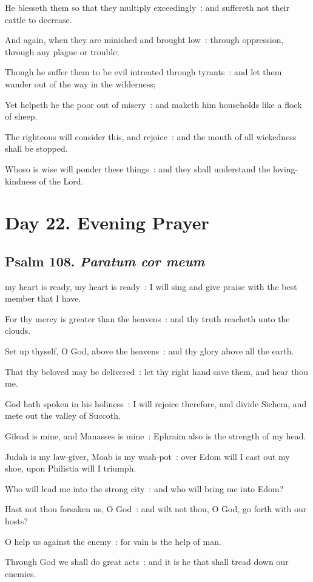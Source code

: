 He blesseth them so that they multiply exceedingly~: and suffereth not their cattle to decrease.\par
{}And again, when they are minished and brought low~: through oppression, through any plague or trouble;\par
{}Though he suffer them to be evil intreated through tyrants~: and let them wander out of the way in the wilderness;\par
{}Yet helpeth he the poor out of misery~: and maketh him households like a flock of sheep.\par
{}The righteous will consider this, and rejoice~: and the mouth of all wickedness shall be stopped.\par
{}Whoso is wise will ponder these things~: and they shall understand the loving-kindness of the Lord.\par


\clearpage
\section*{Day 22. Evening Prayer}

\subsection{Psalm 108. \textit{Paratum cor meum}}

 my heart is ready, my heart is ready~: I will sing and give praise with the best member that I have.\par
{}
For thy mercy is greater than the heavens~: and thy truth reacheth unto the clouds.\par
{}Set up thyself, O God, above the heavens~: and thy glory above all the earth.\par
{}That thy beloved may be delivered~: let thy right hand save them, and hear thou me.\par
{}God hath spoken in his holiness~: I will rejoice therefore, and divide Sichem, and mete out the valley of Succoth.\par
{}Gilead is mine, and Manasses is mine~: Ephraim also is the strength of my head.\par
{}Judah is my law-giver, Moab is my wash-pot~: over Edom will I cast out my shoe, upon Philistia will I triumph.\par
{}Who will lead me into the strong city~: and who will bring me into Edom?\par
{}Hast not thou forsaken us, O God~: and wilt not thou, O God, go forth with our hosts?\par
{}O help us against the enemy~: for vain is the help of man.\par
{}Through God we shall do great acts~: and it is he that shall tread down our enemies.\par

